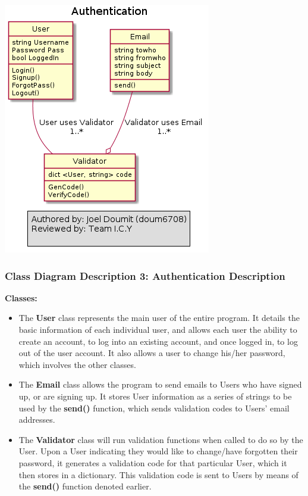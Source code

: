 \documentclass[twoside,letterpaper]{article}
\begin{document}
{\includegraphics[width=\textwidth]{images/ClassDiagrams/Authentication}

\newpage

\subsubsection[Class Diagram Description 3: Authentication Description]{\rmfamily\bfseries\color{black}
	Class Diagram Description 3: Authentication Description}
\hypertarget{RefHeading22059017292}{}

\textbf{Classes:}
\begin{itemize}

	\item The \textbf{User} class represents the main user of the entire program. It details the basic information of each individual user, and allows each user the ability to create an account, to log into an existing account, and once logged in, to log out of the user account. It also allows a user to change his/her password, which involves the other classes.
	\item The \textbf{Email} class allows the program to send emails to Users who have signed up, or are signing up. It stores User information as a series of strings to be used by the \textbf{send()} function, which sends validation codes to Users' email addresses.
	\item The \textbf{Validator} class will run validation functions when called to do so by the User. Upon a User indicating they would like to change/have forgotten their password, it generates a validation code for that particular User, which it then stores in a dictionary. This validation code is sent to Users by means of the \textbf{send()} function denoted earlier.
\end{itemize}

}
\end{document}
